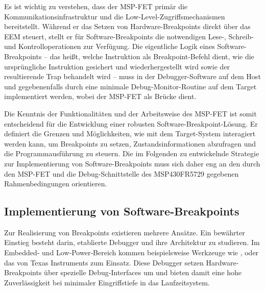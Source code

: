Es ist wichtig zu verstehen, dass der MSP-FET prim\"ar die Kommunikationsinfrastruktur und die Low-Level-Zugriffsmechanismen bereitstellt. W\"ahrend er das Setzen von Hardware-Breakpoints direkt \"uber das EEM steuert, stellt er f\"ur Software-Breakpoints die notwendigen Lese-, Schreib- und Kontrolloperationen zur Verf\"ugung. Die eigentliche Logik eines Software-Breakpoints – das hei{\ss}t, welche Instruktion als Breakpoint-Befehl dient, wie die urspr\"ungliche Instruktion gesichert und wiederhergestellt wird sowie der resultierende Trap behandelt wird – muss in der Debugger-Software auf dem Host und gegebenenfalls durch eine minimale Debug-Monitor-Routine auf dem Target implementiert werden, wobei der MSP-FET als Br\"ucke dient.

Die Kenntnis der Funktionalit\"aten und der Arbeitsweise des MSP-FET ist somit entscheidend f\"ur die Entwicklung einer robusten Software-Breakpoint-L\"osung. Er definiert die Grenzen und M\"oglichkeiten, wie mit dem Target-System interagiert werden kann, um Breakpoints zu setzen, Zustandsinformationen abzufragen und die Programmausf\"uhrung zu steuern. Die im Folgenden zu entwickelnde Strategie zur Implementierung von Software-Breakpoints muss sich daher eng an den durch den MSP-FET und die Debug-Schnittstelle des MSP430FR5729 gegebenen Rahmenbedingungen orientieren.


\subsection{Implementierung von Software-Breakpoints}
\label{sec:ImplementierungSoftwareBreakpoints}

Zur Realisierung von Breakpoints existieren mehrere Ans\"atze. Ein bew\"ahrter Einstieg besteht darin, etablierte Debugger und ihre Architektur zu studieren. Im Embedded‑ und Low‑Power‑Bereich kommen beispielsweise Werkzeuge wie ,  oder das  von Texas Instruments zum Einsatz. Diese Debugger setzen Hardware-Breakpoints \"uber spezielle Debug‑Interfaces um und bieten damit eine hohe Zuverl\"assigkeit bei minimaler Eingriffstiefe in das Laufzeitsystem.

